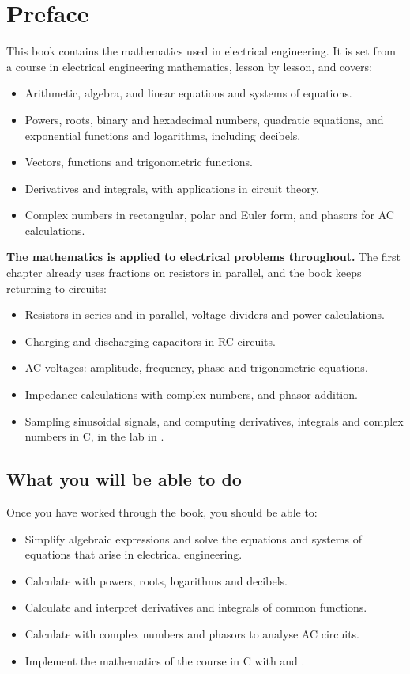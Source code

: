 
\chapter{Preface}

This book contains the mathematics used in electrical engineering. It is set from a course in
electrical engineering mathematics, lesson by lesson, and covers:
\begin{itemize}
  \item Arithmetic, algebra, and linear equations and systems of equations.
  \item Powers, roots, binary and hexadecimal numbers, quadratic equations, and exponential
    functions and logarithms, including decibels.
  \item Vectors, functions and trigonometric functions.
  \item Derivatives and integrals, with applications in circuit theory.
  \item Complex numbers in rectangular, polar and Euler form, and phasors for AC calculations.
\end{itemize}

\textbf{The mathematics is applied to electrical problems throughout.} The first chapter already
uses fractions on resistors in parallel, and the book keeps returning to circuits:
\begin{itemize}
  \item Resistors in series and in parallel, voltage dividers and power calculations.
  \item Charging and discharging capacitors in RC circuits.
  \item AC voltages: amplitude, frequency, phase and trigonometric equations.
  \item Impedance calculations with complex numbers, and phasor addition.
  \item Sampling sinusoidal signals, and computing derivatives, integrals and complex numbers in
    C, in the lab in .
\end{itemize}

\section*{What you will be able to do}
Once you have worked through the book, you should be able to:
\begin{itemize}
  \item Simplify algebraic expressions and solve the equations and systems of equations that
    arise in electrical engineering.
  \item Calculate with powers, roots, logarithms and decibels.
  \item Calculate and interpret derivatives and integrals of common functions.
  \item Calculate with complex numbers and phasors to analyse AC circuits.
  \item Implement the mathematics of the course in C with  and .
\end{itemize}

